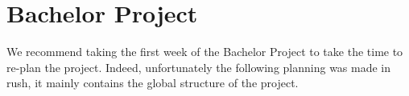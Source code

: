 
\section{Bachelor Project}
We recommend taking the first week of the Bachelor Project to take the time to re-plan the project. Indeed, unfortunately the following planning was made in rush, it mainly contains the global structure of the project.


\clearpage


\clearpage

